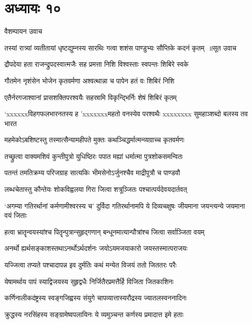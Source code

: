 \chapter{अध्यायः १०}
\twolineshloka
{वैशम्पायन उवाच}
{}


\threelineshloka
{तस्यां रात्र्यां व्यतीतायां धृष्टद्युम्नस्य सारथिः}
{गत्वा शशंस पाण्डुभ्यः सौप्तिके कदनं कृतम् ॥सूत उवाच}
{}


\twolineshloka
{द्रौपदेया हता राजन्द्रुपदस्वात्मजैः सह}
{प्रमत्ता निशि विश्वस्ताः स्वपन्तः शिबिरे स्वके}


\twolineshloka
{गौतमेन नृशंसेन भोजेन कृतवर्मणा}
{अश्वत्थान्ना च पापेन हतं वः शिबिरं निशि}


\twolineshloka
{एतैर्नरगजाश्वानां प्रासशक्तिपरश्वयैः}
{सहस्रामि विकृन्द्भिर्निः शेषं शिबिरं कृतम्}


\threelineshloka
{`xxxxxxविहगफलभारनतस्य ह}
{'xxxxxxxमहतो वनस्येव परश्वथैः}
{xxxxxxxx सुमहाञ्शब्दो बलस्य तव भारत}


\twolineshloka
{महमेकोऽबशिष्टस्तु तस्मात्सैन्यामहीपते}
{मुक्तः कथञ्चिद्धर्मात्मन्व्यग्राच्च कृतवर्मणः}


\twolineshloka
{तच्छ्रुत्वा वाक्यमशिवं कुन्तीपुत्रो युधिष्ठिरः}
{पपात मह्यां धर्मात्मा पुत्रशोकसमन्वितः}


\twolineshloka
{पतन्तं तमतिक्रम्य परिजग्राह सात्यकिः}
{भीमसेनोऽर्जुनश्चैव माद्रीपुत्रौ च पाण्डवौ}


\twolineshloka
{लब्धचेतास्तु कौन्तेयः शोकविह्वलया गिरा}
{जित्वा शत्रूञ्जितः पश्चात्पर्यदेवयदार्तवत्}


\threelineshloka
{`अगम्या गतिरर्थानां कर्मणामीश्वरस्य च'}
{दुर्विदा गतिरर्थानामपि ये दिव्यचक्षुषः}
{जीयमाना जयन्त्यन्ये जयमाना वयं जिताः}


\twolineshloka
{हत्वा भ्रातॄन्वयस्यांश्च पितॄन्पुत्रान्सुहृद्गणान्}
{बन्धूनमात्यान्पौत्रांश्च जित्वा सर्वाञ्जिता वयम्}


\twolineshloka
{अनर्थो ह्यर्थसङ्काशस्तथाऽनर्थोऽर्थदर्शनः}
{जयोऽयमजयाकारो जयस्तस्मात्पराजयः}


\twolineshloka
{यज्जित्वा तप्यते पश्चादापन्न इव दुर्मतिः}
{कथं मन्येत विजयं ततो जिततरः परैः}


\twolineshloka
{येषामर्थाय पापं स्याद्विजयस्य सुहृद्वधैः}
{निर्जितैरप्रमत्तैर्हि विजिता जितकाशिनः}


\twolineshloka
{कर्णिनालीकदंष्ट्रस्य स्वङ्गजिह्वस्य संयुगे}
{चापव्यात्तास्यरौद्रस्य ज्यातलस्वननादिनः}


\twolineshloka
{क्रुद्धस्य नरसिंहस्य सङ्ग्रामेष्वपलायिनः}
{ये व्यमुञ्चन्त कर्णस्य प्रमादात्त इमे हताः}


